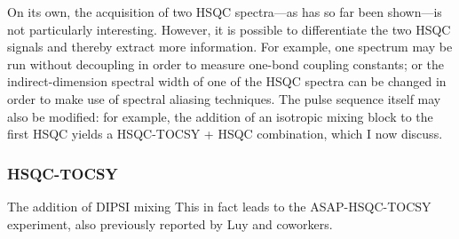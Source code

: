


On its own, the acquisition of two HSQC spectra---as has so far been shown---is not particularly interesting.
However, it is possible to differentiate the two HSQC signals and thereby extract more information.
For example, one spectrum may be run without decoupling in order to measure one-bond coupling constants\autocite{Enthart2008JMR,Nolis2019CPC}; or the indirect-dimension spectral width of one of the HSQC spectra can be changed in order to make use of spectral aliasing techniques\autocite{Nolis2019JMR,Jeannerat2011eMR}.
The pulse sequence itself may also be modified: for example, the addition of an isotropic mixing block to the first HSQC yields a HSQC-TOCSY + HSQC combination\autocite{Nolis2019CPC}, which I now discuss.


\subsubsection{HSQC-TOCSY}

The addition of DIPSI mixing
This in fact leads to the ASAP-HSQC-TOCSY experiment, also previously reported by Luy and coworkers\autocite{Becker2019JMR}.

